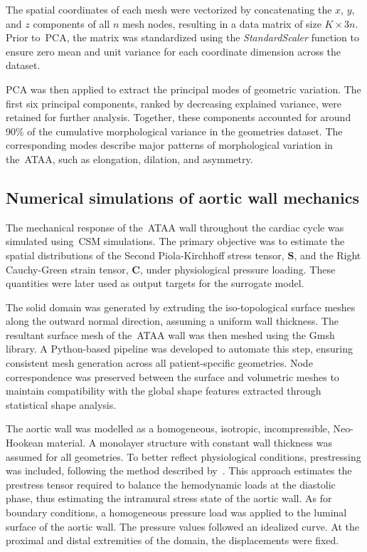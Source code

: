 \documentclass[a4paper,fleqn]{cas-sc}
\begin{document}
  The spatial coordinates of each mesh were vectorized by concatenating the $x$, $y$, and $z$ components of all $n$ mesh nodes, resulting in a data matrix of size $K \times 3n$. Prior to~\gls{PCA}, the matrix was standardized using the \textit{StandardScaler} function to ensure zero mean and unit variance for each coordinate dimension across the dataset.

  \gls{PCA} was then applied to extract the principal modes of geometric variation. The first six principal components, ranked by decreasing explained variance, were retained for further analysis. Together, these components accounted for around 90\% of the cumulative morphological variance in the geometries dataset. The corresponding modes describe major patterns of morphological variation in the~\gls{ATAA}, such as elongation, dilation, and asymmetry.

\subsection{Numerical simulations of aortic wall mechanics}
  The mechanical response of the~\gls{ATAA} wall throughout the cardiac cycle was simulated using~\gls{CSM} simulations. The primary objective was to estimate the spatial distributions of the Second Piola-Kirchhoff stress tensor, $\bm{S}$, and the Right Cauchy-Green strain tensor, $\bm{C}$, under physiological pressure loading. These quantities were later used as output targets for the surrogate model.

  The solid domain was generated by extruding the iso-topological surface meshes along the outward normal direction, assuming a uniform wall thickness. The resultant surface mesh of the~\gls{ATAA} wall was then meshed using the Gmsh library. A Python-based pipeline was developed to automate this step, ensuring consistent mesh generation across all patient-specific geometries. Node correspondence was preserved between the surface and volumetric meshes to maintain compatibility with the global shape features extracted through statistical shape analysis.

  The aortic wall was modelled as a homogeneous, isotropic, incompressible, Neo-Hookean material. A monolayer structure with constant wall thickness was assumed for all geometries. To better reflect physiological conditions, prestressing was included, following the method described by~\citet{hsu2011}. This approach estimates the prestress tensor required to balance the hemodynamic loads at the diastolic phase, thus estimating the intramural stress state of the aortic wall. As for boundary conditions, a homogeneous pressure load was applied to the luminal surface of the aortic wall. The pressure values followed an idealized curve. At the proximal and distal extremities of the domain, the displacements were fixed.
\end{document}
